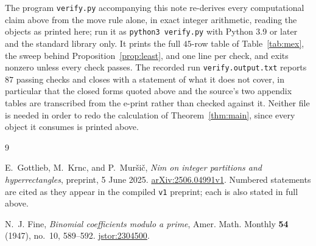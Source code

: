 \documentclass[11pt]{amsart}
\theoremstyle{definition}
\theoremstyle{remark}
\begin{document}
The program \texttt{verify.py} accompanying this note re-derives every
computational claim above from the move rule alone, in exact integer
arithmetic, reading the objects as printed here; run it as
\texttt{python3 verify.py} with Python 3.9 or later and the standard library
only. It prints the full $45$-row table of Table~\ref{tab:mex}, the sweep
behind Proposition~\ref{prop:least}, and one line per check, and exits nonzero
unless every check passes. The recorded run \texttt{verify.output.txt} reports
$87$ passing checks and closes with a statement of what it does not cover, in
particular that the closed forms quoted above and the source's two appendix
tables are transcribed from the e-print rather than checked against it. Neither
file is needed in order to redo the calculation of Theorem~\ref{thm:main},
since every object it consumes is printed above.

\begin{thebibliography}{9}

E.~Gottlieb, M.~Krnc, and P.~Mur\v{s}i\v{c},
\emph{Nim on integer partitions and hyperrectangles},
preprint, 5 June 2025.
\href{https://arxiv.org/abs/2506.04991v1}{arXiv:2506.04991v1}.
Numbered statements are cited as they appear in the compiled \texttt{v1}
preprint; each is also stated in full above.

N.~J. Fine,
\emph{Binomial coefficients modulo a prime},
Amer. Math. Monthly \textbf{54} (1947), no.~10, 589--592.
\href{http://www.jstor.org/stable/2304500}{jstor:2304500}.

\end{thebibliography}
\end{document}
